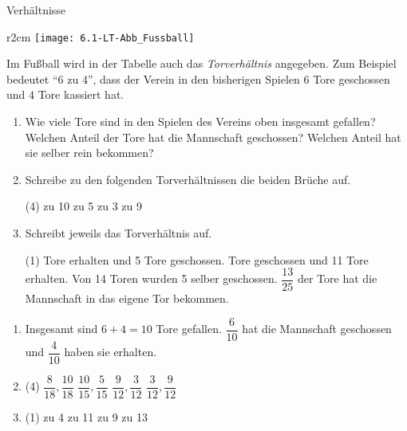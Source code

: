 \documentclass[12pt,a5paper,landscape]{scrartcl}
\begin{document}
	\begin{karte2}[\symPartner]{Verhältnisse}
		\begingroup
		\setlength\intextsep{0pt}
		\begin{wrapfigure}{r}{2cm}
			\texttt{[image: 6.1-LT-Abb\_Fussball]}
		\end{wrapfigure}
		Im Fußball wird in der Tabelle auch das \emph{Torverhältnis} angegeben. Zum Beispiel bedeutet \enquote{6 zu 4}, dass der Verein in den bisherigen Spielen $6$ Tore geschossen und $4$ Tore kassiert hat.\par
		\endgroup
		
		\begin{enumerate}\small
			\item Wie viele Tore sind in den Spielen des Vereins oben insgesamt gefallen? Welchen Anteil der Tore hat die Mannschaft geschossen? Welchen Anteil hat sie selber rein bekommen?
			\item Schreibe zu den folgenden Torverhältnissen die beiden Brüche auf.
				\begin{tasks}(4)
					 zu 10
					 zu 5
					 zu 3
					 zu 9
				\end{tasks}
			\item Schreibt jeweils das Torverhältnis auf.
				\begin{tasks}(1)
					 Tore erhalten und 5 Tore geschossen.
					 Tore geschossen und 11 Tore erhalten.
					\task Von 14 Toren wurden 5 selber geschossen.
					\task $\dfrac{13}{25}$ der Tore hat die Mannschaft in das eigene Tor bekommen.
				\end{tasks}
		\end{enumerate}
	\end{karte2}
	
	\begin{loesungskarte}
		\begin{enumerate}
			\item Insgesamt sind $6+4=10$ Tore gefallen. $\dfrac{6}{10}$ hat die Mannschaft geschossen und $\dfrac{4}{10}$ haben sie erhalten.
			
			\item\begin{tasks}(4)
				\task $\dfrac{8}{18}, \dfrac{10}{18}$
				\task $\dfrac{10}{15}, \dfrac{5}{15}$
				\task $\dfrac{9}{12}, \dfrac{3}{12}$
				\task $\dfrac{3}{12}, \dfrac{9}{12}$
			\end{tasks}
				
			\item\begin{tasks}(1)
				\task 5 zu 4
				\task 2 zu 11
				\task 5 zu 9
				\task 12 zu 13
			\end{tasks}
		\end{enumerate}
	\end{loesungskarte}
\end{document}
